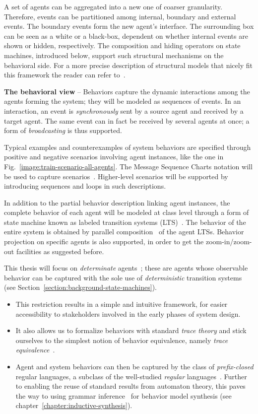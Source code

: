 A set of agents can be aggregated into a new one of coarser granularity. Therefore, events can be partitioned among internal, boundary and external events. The boundary events form the new agent's interface. The surrounding box can be seen as a white or a black-box, dependent on whether internal events are shown or hidden, respectively. The composition and hiding operators on state machines, introduced below, support such structural mechanisms on the behavioral side. For a more precise description of structural models that nicely fit this framework the reader can refer to~\cite{Magee:1995}.


\noindent \textbf{The behavioral view} -- Behaviors capture the dynamic interactions among the agents forming the system; they will be modeled as sequences of events. In an interaction, an event is \emph{synchronously} sent by a source agent and received by a target agent. The same event can in fact be received by several agents at once; a form of \emph{broadcasting} is thus supported. 

Typical examples and counterexamples of system behaviors are specified through positive and negative scenarios involving agent instances, like the one in Fig.~\ref{image:train-scenario-all-agents}. The Message Sequence Charts notation will be used to capture scenarios~\cite{ITU:1996}. Higher-level scenarios will be supported by introducing sequences and loops in such descriptions.

In addition to the partial behavior description linking agent instances, the complete behavior of each agent will be modeled at class level through a form of state machine known as labeled transition systems (LTS)~\cite{Keller:1976, Milner:1989}. The behavior of the entire system is obtained by parallel composition~\cite{Hoare:1985} of the agent LTSs. Behavior  projection on specific agents is also supported, in order to get the zoom-in/zoom-out facilities as suggested before.

This thesis will focus on \emph{determinate} agents~\cite{Engelfriet:1985}; these are agents whose observable behavior can be captured with the sole use of \emph{deterministic} transition systems (see Section~\ref{section:background-state-machines}).
\begin{itemize} 
\item This restriction results in a simple and intuitive framework, for easier accessibility to stakeholders involved in the early phases of system design. 
\item It also allows us to formalize behaviors with standard \emph{trace theory} \cite{Hoare:1985} and stick ourselves to the simplest notion of behavior equivalence, namely \emph{trace equivalence}~\cite{Engelfriet:1985}. 
\item Agent and system behaviors can then be captured by the class of \emph{prefix-closed} regular languages, a subclass of the well-studied \emph{regular} languages~\cite{Hopcroft:1979, Aho:1986}. Further to enabling the reuse of standard results from automaton theory, this paves the way to using grammar inference~\cite{Gold:1978} for behavior model synthesis (see chapter~\ref{chapter:inductive-synthesis}). 
\end{itemize}

